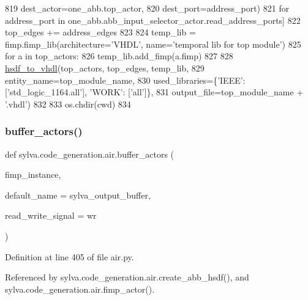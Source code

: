 \begin{DoxyCode}
819                 dest\_actor=one\_abb.top\_actor,
820                 dest\_port=address\_port)
821                 \textcolor{keywordflow}{for} address\_port \textcolor{keywordflow}{in} one\_abb.abb\_input\_selector\_actor.read\_address\_ports]
822             top\_edges += address\_edges
823 
824     temp\_lib = fimp.fimp\_lib(architecture=\textcolor{stringliteral}{'VHDL'}, name=\textcolor{stringliteral}{'temporal lib for top module'})
825     \textcolor{keywordflow}{for} a \textcolor{keywordflow}{in} top\_actors:
826         temp\_lib.add\_fimp(a.fimp)
827 
828     \hyperlink{namespacesylva_1_1code__generation_1_1hsdf__to__vhdl_a0725288caa57a5c518a1b9c2683291fa}{hsdf\_to\_vhdl}(top\_actors, top\_edges, temp\_lib,
829                  entity\_name=top\_module\_name,
830                  used\_libraries=\{\textcolor{stringliteral}{'IEEE'}: [\textcolor{stringliteral}{'std\_logic\_1164.all'}], \textcolor{stringliteral}{'WORK'}: [\textcolor{stringliteral}{'all'}]\},
831                  output\_file=top\_module\_name + \textcolor{stringliteral}{'.vhdl'})
832 
833     os.chdir(cwd)
834 \end{DoxyCode}
\mbox{\label{namespacesylva_1_1code__generation_1_1air_a2437e8f4411d574d2a354bee377e1e31}} 
\subsubsection{\texorpdfstring{buffer\+\_\+actors()}{buffer\_actors()}}
{\footnotesize\ttfamily def sylva.\+code\+\_\+generation.\+air.\+buffer\+\_\+actors (\begin{DoxyParamCaption}\item[{}]{fimp\+\_\+instance,  }\item[{}]{default\+\_\+name = {\ttfamily \textquotesingle{}sylva\+\_\+output\+\_\+buffer\textquotesingle{}},  }\item[{}]{read\+\_\+write\+\_\+signal = {\ttfamily \textquotesingle{}wr\textquotesingle{}} }\end{DoxyParamCaption})}



Definition at line 405 of file air.\+py.



Referenced by sylva.\+code\+\_\+generation.\+air.\+create\+\_\+abb\+\_\+hsdf(), and sylva.\+code\+\_\+generation.\+air.\+fimp\+\_\+actor().


